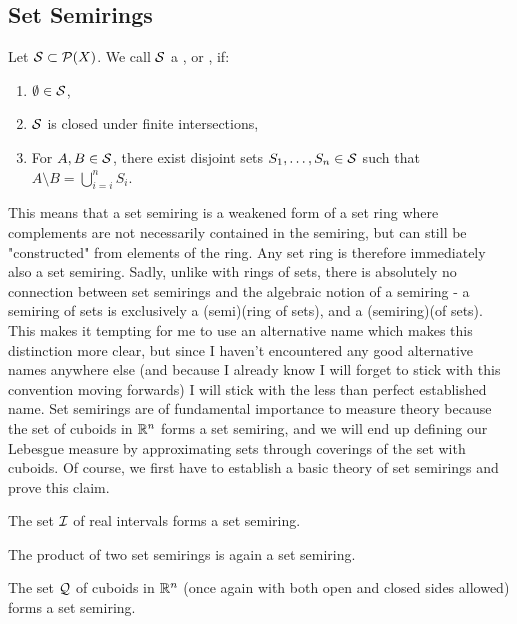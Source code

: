 \subsection{Set Semirings}
\begin{theorem}
	Let $\mathcal{S} \subset \mathcal{P}(X)$. We call $\mathcal{S}$ a , or , if:
	\begin{enumerate}
		\item $\emptyset \in \mathcal{S}$,
		\item $\mathcal{S}$ is closed under finite intersections,
		\item For $A,B \in \mathcal{S}$, there exist disjoint sets $S_1, \hdots, S_n \in \mathcal{S}$ such that $A \setminus B = \bigcup_{i = i}^n S_i$.
	\end{enumerate}
\end{theorem}
This means that a set semiring is a weakened form of a set ring where complements are not necessarily contained in the semiring, but can still be "constructed" from elements of the ring. Any set ring is therefore immediately also a set semiring.
\newpar
Sadly, unlike with rings of sets, there is absolutely no connection between set semirings and the algebraic notion of a semiring - a semiring of sets is exclusively a (semi)(ring of sets), and  a (semiring)(of sets). This makes it tempting for me to use an alternative name which makes this distinction more clear, but since I haven't encountered any good alternative names anywhere else (and because I already know I will forget to stick with this convention moving forwards) I will stick with the less than perfect established name.
\newpar
Set semirings are of fundamental importance to measure theory because the set of cuboids in $\mathbb{R}^n$ forms a set semiring, and we will end up defining our Lebesgue measure by approximating sets through coverings of the set with cuboids. Of course, we first have to establish a basic theory of set semirings and prove this claim.
\begin{theorem}
	The set $\mathcal{I}$ of real intervals forms a set semiring.
\end{theorem}
\begin{theorem}
	The product of two set semirings is again a set semiring.
\end{theorem}
\begin{corollary}
	The set $\mathcal{Q}$ of cuboids in $\mathbb{R}^n$ (once again with both open and closed sides allowed) forms a set semiring.
\end{corollary}

\clearpage

